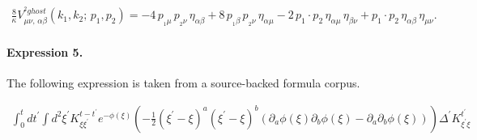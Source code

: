 \documentclass[11pt]{article}
\begin{document}
\begin{align*}\displaystyle{\frac {8}{\kappa}}V^{^2ghost}_{\mu\nu,\,\alpha\beta}(k_1,k_2;\,p_1,p_2)=-4\,p_{_1\mu }\,p_{_2\nu }\,\eta_{\alpha \beta } + 8\,p_{_1\beta }\,p_{_2\nu }\,\eta_{\alpha \mu } - 2\,p_1 \cdot p_2\,\eta_{\alpha \mu }\,\eta_{\beta \nu } + p_1 \cdot p_2\,\eta_{\alpha \beta }\,\eta_{\mu \nu }.\end{align*}

\paragraph{Expression 5.} The following expression is taken from a source-backed formula corpus.

\begin{align*}\int_{0}^{t}dt^{\prime}\int d^{2}\xi^{\prime}K^{t-t^{\prime}}_{\xi\xi^{\prime}}e^{-\phi(\xi)}\left(-\frac{1}{2}(\xi^{\prime}-\xi)^{a}(\xi^{\prime}-\xi)^{b}\left(\partial_{a}\phi(\xi)\partial_{b}\phi(\xi)-\partial_{a}\partial_{b}\phi(\xi)\right)\right)\Delta^{\prime}K^{t^{\prime}}_{\xi^{\prime}\xi}\end{align*}
\end{document}
